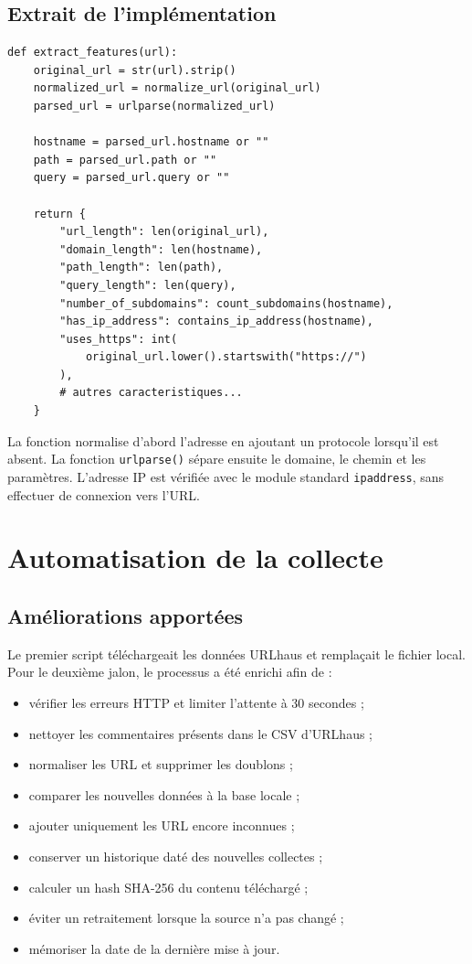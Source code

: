 \documentclass[11pt,a4paper]{report}
\begin{document}
\section{Extrait de l'implémentation}

\begin{lstlisting}[caption={Extrait de la fonction d'extraction}]
def extract_features(url):
    original_url = str(url).strip()
    normalized_url = normalize_url(original_url)
    parsed_url = urlparse(normalized_url)

    hostname = parsed_url.hostname or ""
    path = parsed_url.path or ""
    query = parsed_url.query or ""

    return {
        "url_length": len(original_url),
        "domain_length": len(hostname),
        "path_length": len(path),
        "query_length": len(query),
        "number_of_subdomains": count_subdomains(hostname),
        "has_ip_address": contains_ip_address(hostname),
        "uses_https": int(
            original_url.lower().startswith("https://")
        ),
        # autres caracteristiques...
    }
\end{lstlisting}

La fonction normalise d'abord l'adresse en ajoutant un protocole lorsqu'il est
absent. La fonction \texttt{urlparse()} sépare ensuite le domaine, le chemin et
les paramètres. L'adresse IP est vérifiée avec le module standard
\texttt{ipaddress}, sans effectuer de connexion vers l'URL.

\chapter{Automatisation de la collecte}

\section{Améliorations apportées}

Le premier script téléchargeait les données URLhaus et remplaçait le fichier
local. Pour le deuxième jalon, le processus a été enrichi afin de :

\begin{itemize}
  \item vérifier les erreurs HTTP et limiter l'attente à 30 secondes ;
  \item nettoyer les commentaires présents dans le CSV d'URLhaus ;
  \item normaliser les URL et supprimer les doublons ;
  \item comparer les nouvelles données à la base locale ;
  \item ajouter uniquement les URL encore inconnues ;
  \item conserver un historique daté des nouvelles collectes ;
  \item calculer un hash SHA-256 du contenu téléchargé ;
  \item éviter un retraitement lorsque la source n'a pas changé ;
  \item mémoriser la date de la dernière mise à jour.
\end{itemize}
\end{document}
